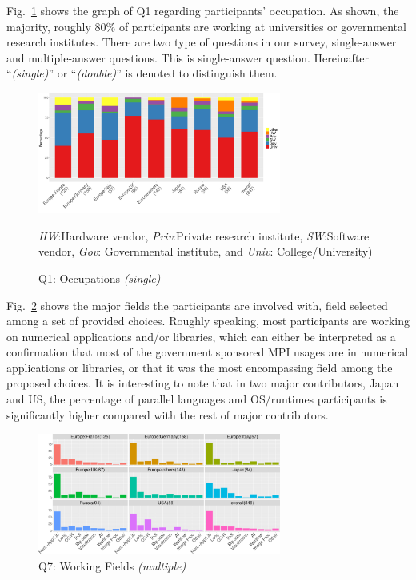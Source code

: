 \documentclass[preprint,5p,times]{elsarticle}
\def\myquote#1{{\it #1}}
\newcommand{\revision}[2]{{\color{blue}#2}}
\def\mcountries{major contributors\xspace{}}%
\begin{document}
Fig.~\ref{fig:occupations} shows the graph of Q1 regarding participants'
occupation. As shown, the majority, roughly 80\% of participants are working at
universities or governmental research institutes. \revision{}{There
  are two type of questions in our survey, single-answer and multiple-answer
  questions. This is single-answer question. Hereinafter
  ``{\it (single)}'' or ``{\it (double)}'' is denoted to distinguish them.}
%
\begin{figure}[tb]
  \begin{center}
    \includegraphics[width=8.0cm]{R-scripts/Q1.pdf}
  \begin{center}
  \end{center}
  \vspace{-10mm}
         {\footnotesize
           \myquote{HW}:Hardware vendor,
           \myquote{Priv}:Private research institute,
           \myquote{SW}:Software vendor, \myquote{Gov}:
           Governmental institute, and \myquote{Univ}:
           College/University)
    }
    \caption{Q1: Occupations {\it(single)}}
    \label{fig:occupations}
\vspace{-3mm}%
  \end{center}
\end{figure}

Fig.~\ref{fig:working-fields} shows the major field\revision{}{s} the
participants are 
involved with, field selected among a set of provided choices.
Roughly speaking, most participants are working on numerical applications and/or
libraries, which can either be interpreted as a confirmation that most of the
government sponsored MPI usages are in numerical applications or libraries, or
that it was the most encompassing field among the proposed choices.
%
It is interesting to note that in \revision{2}{two} \mcountries, Japan and US, the percentage of
parallel languages and OS/runtimes participants is significantly higher compared
with the rest of \mcountries.

\begin{figure}[tb]
  \begin{center}
    \includegraphics[width=8.0cm]{R-scripts/Q7.pdf}
    \caption{Q7: Working Fields {\it(multiple)}}
    \label{fig:working-fields}
\vspace{-3mm}%
  \end{center}
\end{figure}
\end{document}
